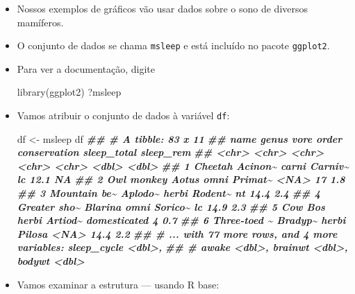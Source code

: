 \documentclass[
  11pt]{report}
\newenvironment{Shaded}{\begin{snugshade}}{\end{snugshade}}
\newcommand{\DocumentationTok}[1]{\textcolor[rgb]{0.56,0.35,0.01}{\textbf{\textit{#1}}}}
\newcommand{\FunctionTok}[1]{\textcolor[rgb]{0.00,0.00,0.00}{#1}}
\newcommand{\NormalTok}[1]{#1}
\newcommand{\OtherTok}[1]{\textcolor[rgb]{0.56,0.35,0.01}{#1}}
\renewenvironment{Shaded}{
    \begin{mdframed}[%
      roundcorner=2pt,%
      innerleftmargin=5pt,%
      innerrightmargin=5pt,%
      topline=true,%
      leftline=true,%
      rightline=true,%
      bottomline=true,%
      linewidth=0.5pt,%
      linecolor=black!20,%
      backgroundcolor=black!2,%
      skipabove=2ex,%
      skipbelow=2.5ex%
    ]%
  }
  {
    \end{mdframed}
  }
\begin{document}
\begin{itemize}
\item
  Nossos exemplos de gráficos vão usar dados sobre o sono de diversos mamíferos.
\item
  O conjunto de dados se chama \texttt{msleep} e está incluído no pacote \texttt{ggplot2}.
\item
  Para ver a documentação, digite

\begin{Shaded}
\begin{Highlighting}[]
\FunctionTok{library}\NormalTok{(ggplot2)}
\NormalTok{?msleep}
\end{Highlighting}
\end{Shaded}
\item
  Vamos atribuir o conjunto de dados à variável \texttt{df}:

\begin{Shaded}
\begin{Highlighting}[]
\NormalTok{df }\OtherTok{\textless{}{-}}\NormalTok{ msleep}
\NormalTok{df}
\DocumentationTok{\#\# \# A tibble: 83 x 11}
\DocumentationTok{\#\#   name         genus   vore  order   conservation sleep\_total sleep\_rem}
\DocumentationTok{\#\#   \textless{}chr\textgreater{}        \textless{}chr\textgreater{}   \textless{}chr\textgreater{} \textless{}chr\textgreater{}   \textless{}chr\textgreater{}              \textless{}dbl\textgreater{}     \textless{}dbl\textgreater{}}
\DocumentationTok{\#\# 1 Cheetah      Acinon\textasciitilde{} carni Carniv\textasciitilde{} lc                  12.1      NA  }
\DocumentationTok{\#\# 2 Owl monkey   Aotus   omni  Primat\textasciitilde{} \textless{}NA\textgreater{}                17         1.8}
\DocumentationTok{\#\# 3 Mountain be\textasciitilde{} Aplodo\textasciitilde{} herbi Rodent\textasciitilde{} nt                  14.4       2.4}
\DocumentationTok{\#\# 4 Greater sho\textasciitilde{} Blarina omni  Sorico\textasciitilde{} lc                  14.9       2.3}
\DocumentationTok{\#\# 5 Cow          Bos     herbi Artiod\textasciitilde{} domesticated         4         0.7}
\DocumentationTok{\#\# 6 Three{-}toed \textasciitilde{} Bradyp\textasciitilde{} herbi Pilosa  \textless{}NA\textgreater{}                14.4       2.2}
\DocumentationTok{\#\# \# ... with 77 more rows, and 4 more variables: sleep\_cycle \textless{}dbl\textgreater{},}
\DocumentationTok{\#\# \#   awake \textless{}dbl\textgreater{}, brainwt \textless{}dbl\textgreater{}, bodywt \textless{}dbl\textgreater{}}
\end{Highlighting}
\end{Shaded}
\item
  Vamos examinar a estrutura --- usando R base:


\end{itemize}
\end{document}
